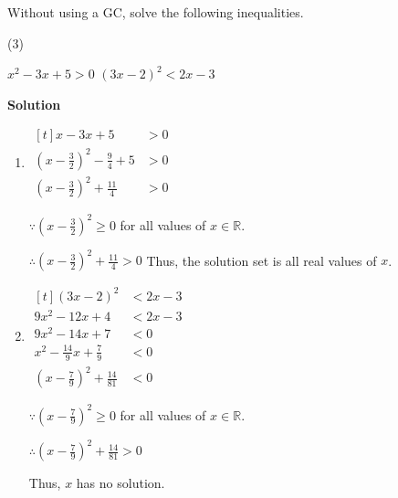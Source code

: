 \documentclass[11pt,a4paper]{book}
\newcommand{\R}{\mathbb{R}}
\begin{document}
\begin{example}{}

Without using a GC, solve the following inequalities.

\begin{tasks}[label=(\alph*),label-width=3.5ex](3)

\task $x^{2}-3x+5>0$
\task $\left(3x-2\right)^{2}<2x-3$

\end{tasks}

\textbf{Solution}

\begin{enumerate}[label=(\alph*)]

\item
$
\begin{aligned}[t]
x-3x+5 & >0\\
\left(x-\frac{3}{2}\right)^{2}-\frac{9}{4}+5 & >0\\
\left(x-\frac{3}{2}\right)^{2}+\frac{11}{4} & >0
\end{aligned}
$

${\displaystyle \because\left(x-\frac{3}{2}\right)^{2}\geq0}$ for
all values of $x\in\R$.

${\displaystyle \therefore\left(x-\frac{3}{2}\right)^{2}+\frac{11}{4}>0}$
Thus, the solution set is all real values of $x$.
\item
$
\begin{aligned}[t]
\left(3x-2\right)^{2} & <2x-3\\
9x^{2}-12x+4 & <2x-3\\
9x^{2}-14x+7 & <0\\
x^{2}-\frac{14}{9}x+\frac{7}{9} & <0\\
\left(x-\frac{7}{9}\right)^{2}+\frac{14}{81} & <0
\end{aligned}
$

${\displaystyle \because\left(x-\frac{7}{9}\right)^{2}\geq0}$ for
all values of $x\in\R$.

${\displaystyle \therefore\left(x-\frac{7}{9}\right)^{2}+\frac{14}{81}>0}$

Thus, $x$ has no solution.

\end{enumerate}
\end{example}

\newpage
\end{document}
